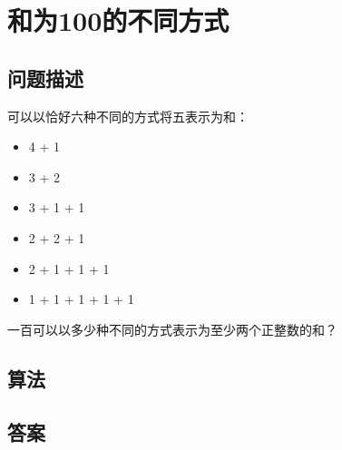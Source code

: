 \section{和为100的不同方式}
\subsection{问题描述}
\begin{tcolorbox}
	可以以恰好六种不同的方式将五表示为和：

	\begin{itemize}
		\item 4 + 1
		\item 3 + 2
		\item 3 + 1 + 1
		\item 2 + 2 + 1
		\item 2 + 1 + 1 + 1
		\item 1 + 1 + 1 + 1 + 1
	\end{itemize}

	一百可以以多少种不同的方式表示为至少两个正整数的和？
\end{tcolorbox}

\subsection{算法}

\subsection{答案}
